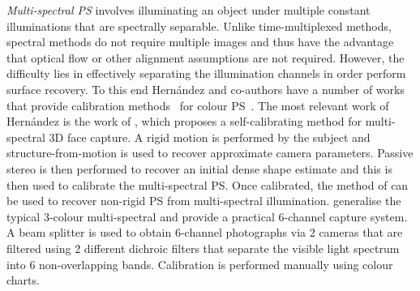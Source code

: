 \textit{Multi-spectral PS} involves illuminating an object under
multiple constant illuminations that are spectrally separable. Unlike
time-multiplexed methods, spectral methods do not require multiple images
and thus have the advantage that optical flow or other alignment assumptions
are not required. However, the difficulty lies in effectively separating the
illumination channels in order perform surface recovery. To this end
Hern{\'a}ndez and co-authors have a number of works that provide
calibration methods~\cite{vogiatzis2012self,hernandez2008multiview,brostow2011video} 
for colour PS~\cite{drew1992shape}. The most relevant work of Hern{\'a}ndez
is the work of \cite{vogiatzis2012self}, which proposes a self-calibrating
method for multi-spectral 3D face capture. A rigid motion is performed by
the subject and structure-from-motion is used to recover approximate camera
parameters. Passive stereo is then performed to recover an initial dense
shape estimate and this is then used to calibrate the multi-spectral PS.
Once calibrated, the method of \citet{brostow2011video} can be used to
recover non-rigid PS from multi-spectral illumination. 
\citet{fyffe2011single} generalise the typical 3-colour multi-spectral
and provide a practical 6-channel capture system. A beam splitter is used
to obtain 6-channel photographs via 2 cameras that are filtered using
2 different dichroic filters that separate the visible light spectrum
into 6 non-overlapping bands. Calibration is performed manually using colour
charts.


